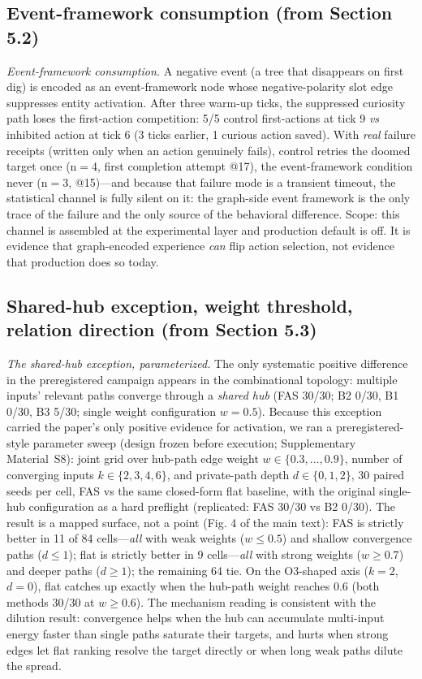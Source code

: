 \documentclass[10pt]{article}
\begin{document}
\subsection{Event-framework consumption (from Section 5.2)}
\emph{Event-framework consumption.} A negative event (a tree that disappears on first dig) is encoded as an event-framework node whose negative-polarity slot edge suppresses entity activation. After three warm-up ticks, the suppressed curiosity path loses the first-action competition: 5/5 control first-actions at tick 9 \emph{vs} inhibited action at tick 6 (3 ticks earlier, 1 curious action saved). With \emph{real} failure receipts (written only when an action genuinely fails), control retries the doomed target once (n$=$4, first completion attempt @17), the event-framework condition never (n$=$3, @15)---and because that failure mode is a transient timeout, the statistical channel is fully silent on it: the graph-side event framework is the only trace of the failure and the only source of the behavioral difference. Scope: this channel is assembled at the experimental layer and production default is off. It is evidence that graph-encoded experience \emph{can} flip action selection, not evidence that production does so today.


\subsection{Shared-hub exception, weight threshold, relation direction (from Section 5.3)}
\emph{The shared-hub exception, parameterized.} The only systematic positive difference in the preregistered campaign appears in the combinational topology: multiple inputs' relevant paths converge through a \emph{shared hub} (FAS 30/30; B2 0/30, B1 0/30, B3 5/30; single weight configuration $w{=}0.5$). Because this exception carried the paper's only positive evidence for activation, we ran a preregistered-style parameter sweep (design frozen before execution; Supplementary Material~S8): joint grid over hub-path edge weight $w\in\{0.3,\ldots,0.9\}$, number of converging inputs $k\in\{2,3,4,6\}$, and private-path depth $d\in\{0,1,2\}$, 30 paired seeds per cell, FAS vs the same closed-form flat baseline, with the original single-hub configuration as a hard preflight (replicated: FAS 30/30 vs B2 0/30). The result is a mapped surface, not a point (Fig. 4 of the main text): FAS is strictly better in 11 of 84 cells---\emph{all} with weak weights ($w{\le}0.5$) and shallow convergence paths ($d{\le}1$); flat is strictly better in 9 cells---\emph{all} with strong weights ($w{\ge}0.7$) and deeper paths ($d{\ge}1$); the remaining 64 tie. On the O3-shaped axis ($k{=}2$, $d{=}0$), flat catches up exactly when the hub-path weight reaches 0.6 (both methods 30/30 at $w{\ge}0.6$). The mechanism reading is consistent with the dilution result: convergence helps when the hub can accumulate multi-input energy faster than single paths saturate their targets, and hurts when strong edges let flat ranking resolve the target directly or when long weak paths dilute the spread.
\end{document}
